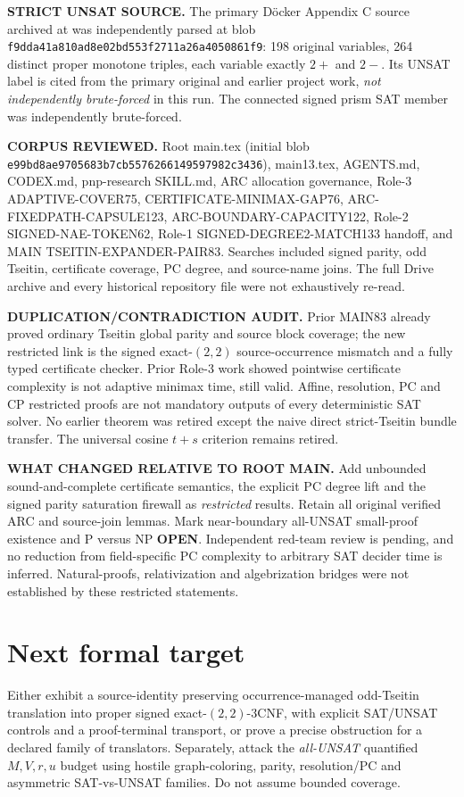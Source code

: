 \documentclass[11pt]{article}
\begin{document}
\textbf{STRICT UNSAT SOURCE.} The primary D\"ocker
Appendix C source archived at
was independently parsed at blob
\texttt{f9dda41a810ad8e02bd553f2711a26a4050861f9}:
198 original variables, 264 distinct proper monotone triples,
each variable exactly $2+$ and $2-$.
Its UNSAT label is cited from the primary original and
earlier project work, \emph{not independently brute-forced}
in this run. The connected signed prism SAT member was
independently brute-forced.

\textbf{CORPUS REVIEWED.} Root main.tex (initial blob
\texttt{e99bd8ae9705683b7cb5576266149597982c3436}),
main13.tex, AGENTS.md, CODEX.md, pnp-research SKILL.md,
ARC allocation governance, Role-3 ADAPTIVE-COVER75,
CERTIFICATE-MINIMAX-GAP76, ARC-FIXEDPATH-CAPSULE123,
ARC-BOUNDARY-CAPACITY122, Role-2 SIGNED-NAE-TOKEN62,
Role-1 SIGNED-DEGREE2-MATCH133 handoff,
and MAIN TSEITIN-EXPANDER-PAIR83.
Searches included signed parity, odd Tseitin,
certificate coverage, PC degree, and source-name joins.
The full Drive archive and every historical repository
file were not exhaustively re-read.

\textbf{DUPLICATION/CONTRADICTION AUDIT.}
Prior MAIN83 already proved ordinary Tseitin global parity
and source block coverage; the new restricted link is the
signed exact-$(2,2)$ source-occurrence mismatch and a
fully typed certificate checker. Prior Role-3 work showed
pointwise certificate complexity is not adaptive
minimax time, still valid. Affine, resolution, PC and
CP restricted proofs are not mandatory outputs of every
deterministic SAT solver. No earlier theorem was retired
except the naive direct strict-Tseitin bundle transfer.
The universal cosine $t+s$ criterion remains retired.

\textbf{WHAT CHANGED RELATIVE TO ROOT MAIN.}
Add unbounded sound-and-complete certificate semantics,
the explicit PC degree lift and the signed parity
saturation firewall as \emph{restricted} results.
Retain all original verified ARC and source-join lemmas.
Mark near-boundary all-UNSAT small-proof existence and
P versus NP \textbf{OPEN}. Independent red-team review
is pending, and no reduction from field-specific
PC complexity to arbitrary SAT decider time is inferred.
Natural-proofs, relativization and algebrization bridges
were not established by these restricted statements.

\section{Next formal target}
Either exhibit a source-identity preserving
occurrence-managed odd-Tseitin translation into proper
signed exact-$(2,2)$-3CNF, with explicit SAT/UNSAT controls
and a proof-terminal transport, or prove a precise
obstruction for a declared family of translators.
Separately, attack the \emph{all-UNSAT} quantified
$M,V,r,u$ budget using hostile graph-coloring,
parity, resolution/PC and asymmetric SAT-vs-UNSAT
families. Do not assume bounded coverage.
\end{document}
